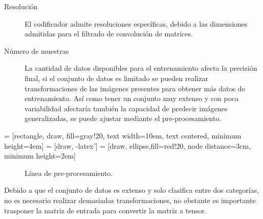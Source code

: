 \begin{description}
    \item[Resolución]{ El codificador admite resoluciones específicas, debido a las dimensiones admitidas para el filtrado de convolución de matrices.}
    \item[Número de muestras]{La cantidad de datos disponibles para el entrenamiento afecta la precisión final, si el conjunto de datos es limitado se pueden realizar transformaciones de las imágenes presentes para obtener más datos de entrenamiento. Así como tener un conjunto muy extenso y con poca variabilidad afectaría también la capacidad de predecir imágenes generalizadas, se puede ajustar mediante el pre-procesamiento.}
    \item[] 
\end{description}


 = [rectangle, draw, fill=gray!20, 
    text width=10em, text centered, minimum height=4em]
 = [draw, -latex']
 = [draw, ellipse,fill=red!20, node distance=3cm,
    minimum height=2em]

\begin{figure}[H]
    \centering
    \begin{adjustbox}{width=0.9\linewidth}
    \end{adjustbox}
    \caption{Línea de pre-procesamiento.}
    \label{fig: pipeline}
\end{figure}


Debido a que el conjunto de datos es extenso y solo clasifica entre dos categorías, no es necesario realizar demasiadas transformaciones, no obstante es importante trasponer la matriz de entrada para convertir la matriz a tensor.


